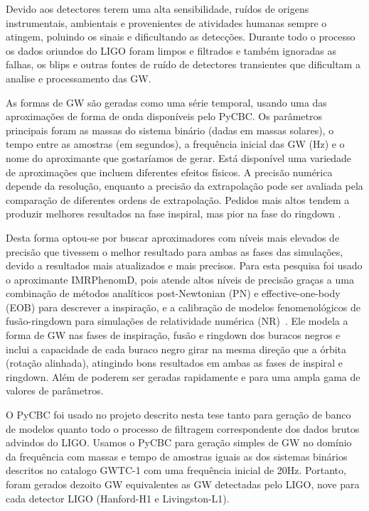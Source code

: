 Devido aos detectores terem uma alta sensibilidade, ruídos de origens instrumentais, ambientais e provenientes de atividades humanas sempre o atingem, poluindo os sinais e dificultando as detecções. Durante todo o processo os dados oriundos do LIGO foram limpos e filtrados e também ignoradas as falhas, os blips e outras fontes de ruído de detectores transientes que dificultam a analise e processamento das GW.

As formas de GW são geradas como uma série temporal, usando uma das aproximações de forma de onda disponíveis pelo PyCBC. Os parâmetros principais foram as massas do sistema binário (dadas em massas solares), o tempo entre as amostras (em segundos), a frequência inicial das GW (Hz) e o nome do aproximante que gostaríamos de gerar. Está disponível uma variedade de aproximações que incluem diferentes efeitos físicos. A precisão numérica depende da resolução, enquanto a precisão da extrapolação pode ser avaliada pela comparação de diferentes ordens de extrapolação. Pedidos mais altos tendem a produzir melhores resultados na fase inspiral, mas pior na fase do ringdown \cite{scharpf2017simulation}. 

Desta forma optou-se por buscar aproximadores com níveis mais elevados de precisão que tivessem o melhor resultado para ambas as fases das simulações, devido a resultados mais atualizados e mais precisos. Para esta pesquisa foi usado o aproximante IMRPhenomD, pois atende altos níveis de precisão graças a uma combinação de métodos analíticos post-Newtonian (PN) e effective-one-body (EOB) para descrever a inspiração, e a calibração de modelos fenomenológicos de fusão-ringdown para simulações de relatividade numérica (NR)~\cite{khan2015frequencydomain}. Ele modela a forma de GW nas fases de inspiração, fusão e ringdown dos buracos negros e inclui a capacidade de cada buraco negro girar na mesma direção que a órbita (rotação alinhada), atingindo bons resultados em ambas as fases de inspiral e ringdown. Além de poderem ser geradas rapidamente e para uma ampla gama de valores de parâmetros.

O PyCBC foi usado no projeto descrito nesta tese tanto para geração de banco de modelos quanto todo o processo de filtragem correspondente dos dados brutos advindos do LIGO. Usamos o PyCBC para geração simples de GW no domínio da frequência com massas e tempo de amostras iguais as dos sistemas binários descritos no catalogo GWTC-1 com uma frequência inicial de 20Hz. Portanto, foram gerados dezoito GW equivalentes as GW detectadas pelo LIGO, nove para cada detector LIGO (Hanford-H1 e Livingston-L1).

